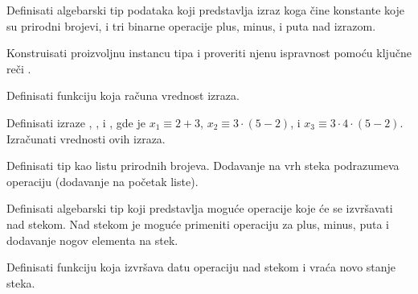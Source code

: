 %
\begin{isabellebody}%
%
%
\isadelimtheory
%
\endisadelimtheory
%
\isatagtheory
%
\endisatagtheory
{\isafoldtheory}%
%
\isadelimtheory
%
\endisadelimtheory
%
\begin{exercise}[subtitle=stek mašina.]
%
\begin{isamarkuptext}%
Definisati algebarski tip podataka  koji predstavlja
      izraz koga čine konstante koje su prirodni brojevi, i tri
      binarne operacije plus, minus, i puta nad izrazom.%
\end{isamarkuptext}\isamarkuptrue%
%
\begin{isamarkuptext}%
Konstruisati proizvoljnu instancu tipa  i proveriti
      njenu ispravnost pomoću ključne reči .%
\end{isamarkuptext}\isamarkuptrue%
%
\begin{isamarkuptext}%
Definisati funkciju  koja računa
      vrednost izraza.%
\end{isamarkuptext}\isamarkuptrue%
%
\begin{isamarkuptext}%
Definisati izraze , , i , gde je
      $x_1 \equiv 2 + 3$, $x_2 \equiv 3 \cdot (5 - 2)$, i $x_3 \equiv 3 \cdot 4 \cdot (5 - 2)$.
      Izračunati vrednosti ovih izraza.%
\end{isamarkuptext}\isamarkuptrue%
%
\begin{isamarkuptext}%
Definisati tip  kao listu prirodnih brojeva. 
      Dodavanje na vrh steka podrazumeva operaciju 
       (dodavanje na početak liste).%
\end{isamarkuptext}\isamarkuptrue%
%
\begin{isamarkuptext}%
Definisati algebarski tip  koji predstavlja
      moguće operacije koje će se izvršavati nad stekom.
      Nad stekom je moguće primeniti operaciju za plus,
      minus, puta i dodavanje nogov elementa na stek.%
\end{isamarkuptext}\isamarkuptrue%
%
\begin{isamarkuptext}%
Definisati funkciju  koja 
      izvršava datu operaciju nad stekom i vraća novo stanje steka.%
\end{isamarkuptext}\isamarkuptrue%
%
\begin{isamarkuptext}%

\end{isamarkuptext}
\end{exercise}
\end{isabellebody}
